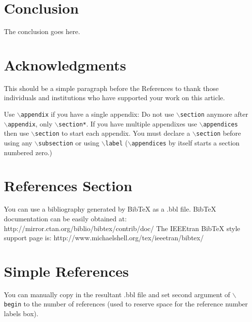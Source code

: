 \documentclass[lettersize,journal]{IEEEtran}
\begin{document}
\section{Conclusion}
The conclusion goes here.


\section*{Acknowledgments}
This should be a simple paragraph before the References to thank those individuals and institutions who have supported your work on this article.



{
Use $\backslash${\tt{appendix}} if you have a single appendix:
Do not use $\backslash${\tt{section}} anymore after $\backslash${\tt{appendix}}, only $\backslash${\tt{section*}}.
If you have multiple appendixes use $\backslash${\tt{appendices}} then use $\backslash${\tt{section}} to start each appendix.
You must declare a $\backslash${\tt{section}} before using any $\backslash${\tt{subsection}} or using $\backslash${\tt{label}} ($\backslash${\tt{appendices}} by itself
 starts a section numbered zero.)}






\section{References Section}
You can use a bibliography generated by BibTeX as a .bbl file.
 BibTeX documentation can be easily obtained at:
 http://mirror.ctan.org/biblio/bibtex/contrib/doc/
 The IEEEtran BibTeX style support page is:
 http://www.michaelshell.org/tex/ieeetran/bibtex/
 
%
%
\section{Simple References}
You can manually copy in the resultant .bbl file and set second argument of $\backslash${\tt{begin}} to the number of references
 (used to reserve space for the reference number labels box).
\end{document}
